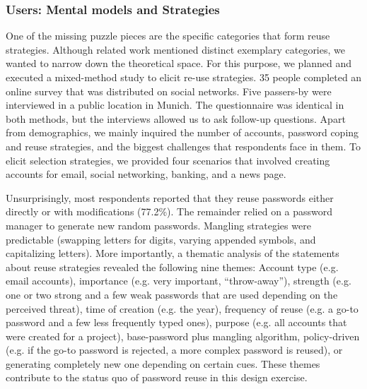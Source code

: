 \subsubsection{Users: Mental models and Strategies}
One of the missing puzzle pieces are the specific categories that form reuse strategies. Although related work mentioned distinct exemplary categories, we wanted to narrow down the theoretical space. For this purpose, we planned and executed a mixed-method study to elicit re-use strategies. 35 people completed an online survey that was distributed on social networks. Five passers-by were interviewed in a public location in Munich. The questionnaire was identical in both methods, but the interviews allowed us to ask follow-up questions. Apart from demographics, we mainly inquired the number of accounts, password coping and reuse strategies, and the biggest challenges that respondents face in them. To elicit selection strategies, we provided four scenarios that involved creating accounts for email, social networking, banking, and a news page.

Unsurprisingly, most respondents reported that they reuse passwords either directly or with modifications (77.2\%). The remainder relied on a password manager to generate new random passwords. Mangling strategies were predictable (swapping letters for digits, varying appended symbols, and capitalizing letters). More importantly, a thematic analysis of the statements about reuse strategies revealed the following nine themes: Account type (e.g. email accounts), importance (e.g. very important, ``throw-away''), strength (e.g. one or two strong and a few weak passwords that are used depending on the perceived threat), time of creation (e.g. the year), frequency of reuse (e.g. a go-to password and a few less frequently typed ones), purpose (e.g. all accounts that were created for a project), base-password plus mangling algorithm, policy-driven (e.g. if the go-to password is rejected, a more complex password is reused), or generating completely new one depending on certain cues. These themes contribute to the status quo of password reuse in this design exercise.  


